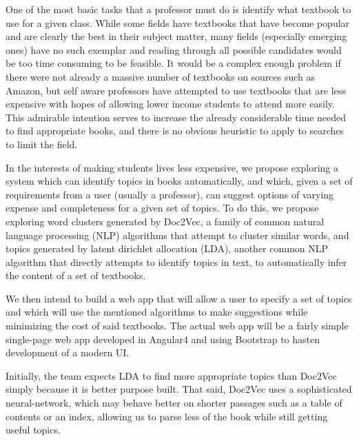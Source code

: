 One of the most basic tasks that a professor must do is identify what textbook to use for a given class.
While some fields have textbooks that have become popular and are clearly the best in their subject matter, many fields (especially emerging ones) have no such exemplar and reading through all possible candidates would be too time consuming to be feasible.  
It would be a complex enough problem if there were not already a massive number of textbooks on sources such as Amazon, but self aware professors have attempted to use textbooks that are less expensive with hopes of allowing lower income students to attend more easily.  
This admirable intention serves to increase the already considerable time needed to find appropriate books, and there is no obvious heuristic to apply to searches to limit the field.  

In the interests of making students lives less expensive, we propose exploring a system which can identify topics in books automatically, and which, given a set of requirements from a user (usually a professor), can suggest options of varying expense and completeness for a given set of topics.  
To do this, we propose exploring word clusters generated by Doc2Vec, a family of common natural language processing (NLP) algorithms that attempt to cluster similar words, and topics generated by latent dirichlet allocation (LDA), another common NLP algorithm that directly attempts to identify topics in text, to automatically infer the content of a set of textbooks.  

We then intend to build a web app that will allow a user to specify a set of topics and which will use the mentioned algorithms to make suggestions while minimizing the cost of said textbooks.  
The actual web app will be a fairly simple single-page web app developed in Angular4 and using Bootstrap to hasten development of a modern UI.  

Initially, the team expects LDA to find more appropriate topics than Doc2Vec simply because it is better purpose built.
That said, Doc2Vec uses a sophisticated neural-network, which may behave better on shorter passages such as a table of contents or an index, allowing us to parse less of the book while still getting useful topics.  
